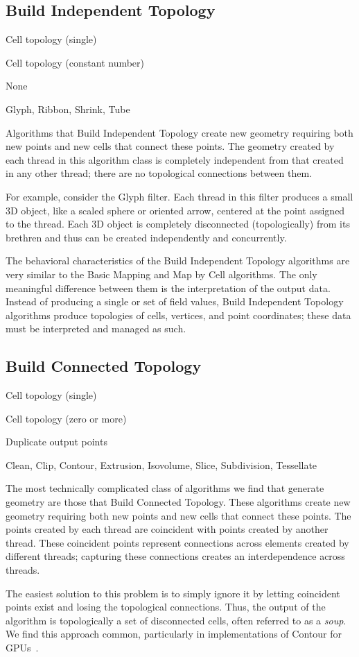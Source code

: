 \documentclass{sig-alternate}
\newcommand*{\lcite}[1]{~\cite{#1}}
\newcommand*{\keyterm}[1]{\emph{#1}}
\newcommand{\algclass}[1]{\textsf{#1}}
\newcommand{\alg}[1]{#1}
\newcommand{\algorithmclasssection}[1]{\subsection*{#1}}
\newcommand{\algorithmclass}[5]{
  \algorithmclasssection{#1} %
  \begin{description}[leftmargin=9em,style=nextline,noitemsep]
    \raggedright
  \item[Input] #2
  \item[Output] #3
  \item[Interdependence] #4
  \item[Algorithms] #5
  \end{description}
}
\begin{document}
\algorithmclass{Build Independent Topology}
               {Cell topology (single)} %
               {Cell topology (constant number)} %
               {None} %
               {Glyph, Ribbon, Shrink, Tube}

\noindent
Algorithms that \algclass{Build Independent Topology} create new geometry
requiring both new points and new cells that connect these points. The
geometry created by each thread in this algorithm class is completely
independent from that created in any other thread; there are no topological
connections between them.

For example, consider the \alg{Glyph} filter. Each thread in this filter
produces a small 3D object, like a scaled sphere or oriented arrow,
centered at the point assigned to the thread. Each 3D object is completely
disconnected (topologically) from its brethren and thus can be created
independently and concurrently.

The behavioral characteristics of the \algclass{Build Independent Topology}
algorithms are very similar to the \algclass{Basic Mapping} and
\algclass{Map by Cell} algorithms. The only meaningful difference between
them is the interpretation of the output data. Instead of producing a
single or set of field values, \algclass{Build Independent Topology}
algorithms produce topologies of cells, vertices, and point coordinates;
these data must be interpreted and managed as such.


\algorithmclass{Build Connected Topology}
               {Cell topology (single)} %
               {Cell topology (zero or more)} %
               {Duplicate output points} %
               {Clean, Clip, Contour, Extrusion, Isovolume, Slice,
                 Subdivision, Tessellate}

\noindent
The most technically complicated class of algorithms we find that generate
geometry are those that \algclass{Build Connected Topology}. These
algorithms create new geometry requiring both new points and new cells that
connect these points. The points created by each thread are coincident with
points created by another thread. These coincident points represent
connections across elements created by different threads; capturing these
connections creates an interdependence across threads.

The easiest solution to this problem is to simply ignore it by letting
coincident points exist and losing the topological connections. Thus, the
output of the algorithm is topologically a set of disconnected cells, often
referred to as a \keyterm{soup}. We find this approach common, particularly
in implementations of \alg{Contour} for
GPUs\lcite{PISTON,Dyken2008,Pascucci2004,Klein2004}.
\end{document}
